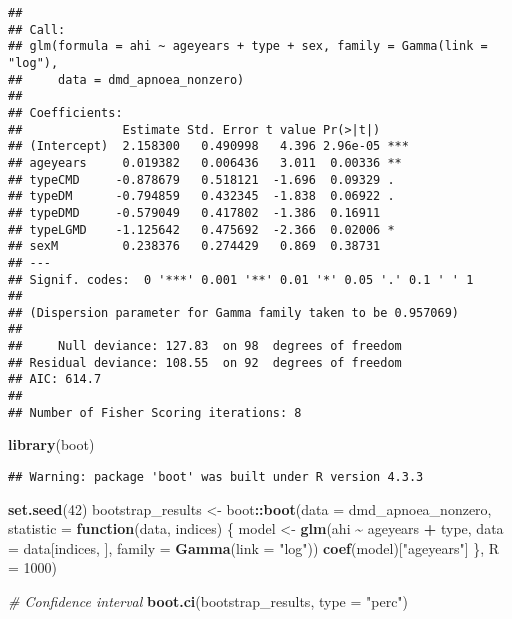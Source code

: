 \documentclass[
]{article}
\newenvironment{Shaded}{\begin{snugshade}}{\end{snugshade}}
\newcommand{\AttributeTok}[1]{\textcolor[rgb]{0.13,0.29,0.53}{#1}}
\newcommand{\CommentTok}[1]{\textcolor[rgb]{0.56,0.35,0.01}{\textit{#1}}}
\newcommand{\ControlFlowTok}[1]{\textcolor[rgb]{0.13,0.29,0.53}{\textbf{#1}}}
\newcommand{\DecValTok}[1]{\textcolor[rgb]{0.00,0.00,0.81}{#1}}
\newcommand{\FunctionTok}[1]{\textcolor[rgb]{0.13,0.29,0.53}{\textbf{#1}}}
\newcommand{\NormalTok}[1]{#1}
\newcommand{\OtherTok}[1]{\textcolor[rgb]{0.56,0.35,0.01}{#1}}
\newcommand{\SpecialCharTok}[1]{\textcolor[rgb]{0.81,0.36,0.00}{\textbf{#1}}}
\newcommand{\StringTok}[1]{\textcolor[rgb]{0.31,0.60,0.02}{#1}}
\begin{document}
\begin{verbatim}
## 
## Call:
## glm(formula = ahi ~ ageyears + type + sex, family = Gamma(link = "log"), 
##     data = dmd_apnoea_nonzero)
## 
## Coefficients:
##              Estimate Std. Error t value Pr(>|t|)    
## (Intercept)  2.158300   0.490998   4.396 2.96e-05 ***
## ageyears     0.019382   0.006436   3.011  0.00336 ** 
## typeCMD     -0.878679   0.518121  -1.696  0.09329 .  
## typeDM      -0.794859   0.432345  -1.838  0.06922 .  
## typeDMD     -0.579049   0.417802  -1.386  0.16911    
## typeLGMD    -1.125642   0.475692  -2.366  0.02006 *  
## sexM         0.238376   0.274429   0.869  0.38731    
## ---
## Signif. codes:  0 '***' 0.001 '**' 0.01 '*' 0.05 '.' 0.1 ' ' 1
## 
## (Dispersion parameter for Gamma family taken to be 0.957069)
## 
##     Null deviance: 127.83  on 98  degrees of freedom
## Residual deviance: 108.55  on 92  degrees of freedom
## AIC: 614.7
## 
## Number of Fisher Scoring iterations: 8
\end{verbatim}

\begin{Shaded}
\begin{Highlighting}[]
\FunctionTok{library}\NormalTok{(boot)}
\end{Highlighting}
\end{Shaded}

\begin{verbatim}
## Warning: package 'boot' was built under R version 4.3.3
\end{verbatim}

\begin{Shaded}
\begin{Highlighting}[]
\FunctionTok{set.seed}\NormalTok{(}\DecValTok{42}\NormalTok{)}
\NormalTok{bootstrap\_results }\OtherTok{\textless{}{-}}\NormalTok{ boot}\SpecialCharTok{::}\FunctionTok{boot}\NormalTok{(}\AttributeTok{data =}\NormalTok{ dmd\_apnoea\_nonzero, }
                                \AttributeTok{statistic =} \ControlFlowTok{function}\NormalTok{(data, indices) \{}
\NormalTok{                                  model }\OtherTok{\textless{}{-}} \FunctionTok{glm}\NormalTok{(ahi }\SpecialCharTok{\textasciitilde{}}\NormalTok{ ageyears }\SpecialCharTok{+}\NormalTok{ type, }
                                               \AttributeTok{data =}\NormalTok{ data[indices, ], }
                                               \AttributeTok{family =} \FunctionTok{Gamma}\NormalTok{(}\AttributeTok{link =} \StringTok{"log"}\NormalTok{))}
                                  \FunctionTok{coef}\NormalTok{(model)[}\StringTok{"ageyears"}\NormalTok{]}
\NormalTok{                                \},}
                                \AttributeTok{R =} \DecValTok{1000}\NormalTok{)}

\CommentTok{\# Confidence interval}
\FunctionTok{boot.ci}\NormalTok{(bootstrap\_results, }\AttributeTok{type =} \StringTok{"perc"}\NormalTok{)}
\end{Highlighting}
\end{Shaded}
\end{document}
